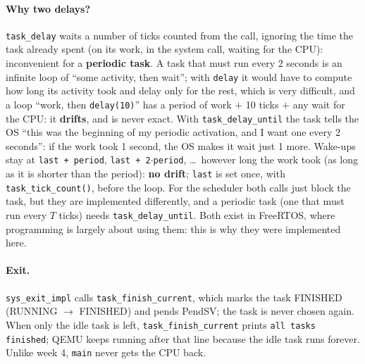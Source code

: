 \paragraph{Why two delays?} \texttt{task\_delay} waits a number of ticks counted from the call, ignoring the time the task already spent (on its work, in the system call, waiting for the CPU): inconvenient for a \textbf{periodic task}. A task that must run every 2 seconds is an infinite loop of ``some activity, then wait''; with \texttt{delay} it would have to compute how long its activity took and delay only for the rest, which is very difficult, and a loop ``work, then \texttt{delay(10)}'' has a period of work $+$ 10 ticks $+$ any wait for the CPU: it \textbf{drifts}, and is never exact. With \texttt{task\_delay\_until} the task tells the OS ``this was the beginning of my periodic activation, and I want one every 2 seconds'': if the work took 1 second, the OS makes it wait just 1 more. Wake-ups stay at \texttt{last + period}, \texttt{last + 2$\cdot$period}, \dots\ however long the work took (as long as it is shorter than the period): \textbf{no drift}; \texttt{last} is set once, with \texttt{task\_tick\_count()}, before the loop. For the scheduler both calls just block the task, but they are implemented differently, and a periodic task (one that must run every $T$ ticks) needs \texttt{task\_delay\_until}. Both exist in FreeRTOS, where programming is largely about using them: this is why they were implemented here.

\paragraph{Exit.} \texttt{sys\_exit\_impl} calls \texttt{task\_finish\_current}, which marks the task FINISHED (RUNNING $\to$ FINISHED) and pends PendSV; the task is never chosen again. When only the idle task is left, \texttt{task\_finish\_current} prints \texttt{all tasks finished}; QEMU keeps running after that line because the idle task runs forever. Unlike week 4, \texttt{main} never gets the CPU back.

